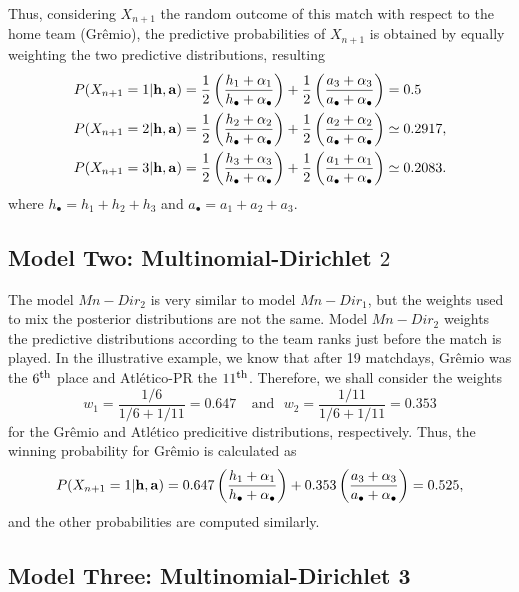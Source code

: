 \documentclass[journal,article,accept,moreauthors,pdftex,12pt,a4paper]{mdpi}
\begin{document}
	Thus, considering $X_{n + 1}$ the random outcome of this match with
	respect to the home team (Gr\^{e}mio), the predictive probabilities
	of $X_{n + 1}$ is obtained by equally weighting the two predictive
	distributions, resulting
	\begin{align*}
	P(X_{n+1}=1|{\bf h}, {\bf a}) &=
	\frac{1}{2}\left(\frac{h_1+\alpha_1}{h_{\bullet}+\alpha_{\bullet}}\right)+\frac{1}{2}\left(\frac{a_3+\alpha_3}{a_{\bullet}+\alpha_{\bullet}}\right)=0.5
	\\
	P(X_{n+1}=2|{\bf h}, {\bf a}) &=
	\frac{1}{2}\left(\frac{h_2+\alpha_2}{h_{\bullet}+\alpha_{\bullet}}\right)+\frac{1}{2}\left(\frac{a_2+\alpha_2}{a_{\bullet}+\alpha_{\bullet}}\right)\simeq0.2917, \\
	P(X_{n+1}=3|{\bf h}, {\bf a}) &= \frac{1}{2}
	\left(\frac{h_3+\alpha_3}{h_{\bullet}+\alpha_{\bullet}}\right)+\frac{1}{2}\left(\frac{a_1+\alpha_1}{a_{\bullet}+\alpha_{\bullet}}\right)\simeq0.2083.
	\end{align*}
	\noindent where $h_{\bullet}=h_1+h_2+h_3$ and $a_{\bullet}=a_1+a_2+a_3$.
	
	\subsection{Model Two: Multinomial-Dirichlet $2$}
	\label{sec::Mn_Dir2}
	
	The model $Mn-Dir_2$ is very similar to model $Mn-Dir_1$, but the
	weights used to mix the posterior distributions are not the same.
	Model $Mn-Dir_2$ weights the predictive distributions according to
	the team ranks just before the match is played. In the illustrative
	example, we know that after 19 matchdays, Gr\^emio was the $6^{\footnotesize\mbox{th}}$
	place and Atl\'etico-PR the $11^{\footnotesize\mbox{th}}$. Therefore, we shall consider
	the weights
	\[w_1 = \frac{1/6}{1/6+1/11}=0.647 ~ ~ ~ ~ ~\text{and} ~ ~ ~ w_2 = \frac{1/11}{1/6+1/11}=0.353\]
	\noindent for the Gr\^emio and Atl\'etico predicitive distributions,
	respectively. Thus, the winning probability for Gr\^emio is
	calculated as
	\[P(X_{n+1}= 1|{\bf h}, {\bf a})=0.647\left(\frac{h_1+\alpha_1}{h_{\bullet}+\alpha_{\bullet}}\right)+0.353\left(\frac{a_3+\alpha_3}{a_{\bullet}+\alpha_{\bullet}}\right)=0.525,\]
	\noindent and the other probabilities are computed similarly.
	
	\subsection{Model Three: Multinomial-Dirichlet 3}
	\label{sec::Mn_Dir3}
	
\end{document}
